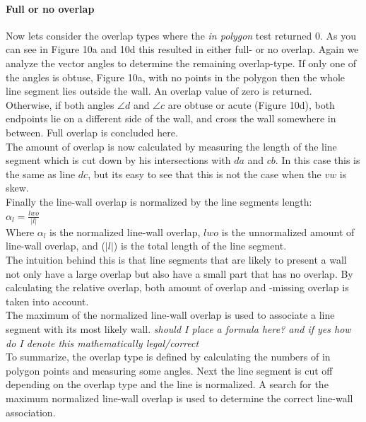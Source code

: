 \documentclass[10pt]{article}
\begin{document}
	\paragraph{Full or no overlap}
	Now lets consider the overlap types where the \emph{in polygon} test
	returned 0.
	As you can see in Figure 10a and 10d this resulted in either full- or no overlap.
	Again we analyze the vector angles to determine the remaining overlap-type.
	If only one of the angles is obtuse, Figure 10a, with no points in the polygon 
	then the whole line segment lies outside the wall. An overlap value of zero
	is returned.\\
	Otherwise, if both angles $\angle d$ and $\angle c$ are obtuse or acute (Figure 10d),
	both endpoints lie on a different side of the wall, and cross the wall somewhere in
	between. Full overlap is concluded here. \\
	The amount of overlap is now calculated by measuring the length
	of the line segment which is cut down by his intersections with $da$ and
	$cb$. In this case this is the same as line $dc$, but its easy to see that
	this is not the case when the $vw$ is skew.\\
	
	Finally the line-wall overlap is normalized by the line segments length:\\
	$\alpha_l = \frac{lwo}{|l|}$\\
	Where $\alpha_l$ is the normalized line-wall overlap, $lwo$ is the unnormalized
	amount of line-wall overlap, and ($|l|$) is the total length of the line
	segment.\\
	The intuition behind this is that line segments that are likely to
	present a wall not only have a large overlap but also have a small part
	that has no overlap. By calculating the relative overlap, both amount of overlap
	and -missing overlap is taken into account.\\
	The maximum of the normalized line-wall overlap is used to associate a
	line segment with its most likely wall.
	\emph{should I place a formula here? and if yes how do I denote this
	mathematically legal/correct}\\
	To summarize, the overlap type is defined by calculating the numbers of in
	polygon points and measuring some angles. Next the line segment is cut off
	depending on the overlap type and the line is normalized. A search for the
	maximum normalized line-wall overlap is used to determine the correct line-wall
	association.\\
\end{document}
